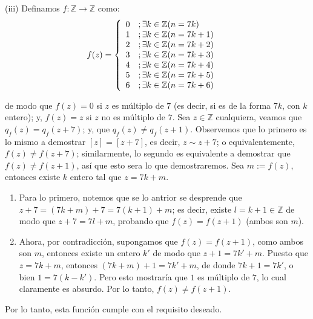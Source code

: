 \documentclass[letterpaper,DIV=14,headsepline,12pt]{scrartcl}
\makeatletter
\newenvironment{solucion}[1][]{%
        \par\pushQED{\hfill \lozenge}%
        \normalfont\topsep6pt \partopsep0pt %
        \trivlist
        \item[\hskip\labelsep
                \textbf{\textit{Solución.}}%
        ]#1
        }{%
        \popQED\endtrivlist\@endpefalse
    }
\makeatother
\begin{document}
\begin{solucion}
        (iii) Definamos $f:\mathbb{Z} \to \mathbb{Z}$ como:
        \begin{align*}
            f(z) &= \left\lbrace \begin{array}{l l}
            0 & ; \exists k \in \mathbb{Z} (n = 7k) \\
            1 & ; \exists k \in \mathbb{Z} (n = 7k+1) \\
            2 & ; \exists k \in \mathbb{Z} (n = 7k+2) \\
            3 & ; \exists k \in \mathbb{Z} (n = 7k+3) \\
            4 & ; \exists k \in \mathbb{Z} (n = 7k+4) \\
            5 & ; \exists k \in \mathbb{Z} (n = 7k+5) \\
            6 & ; \exists k \in \mathbb{Z} (n = 7k+6)
        \end{array} \right.
        \end{align*}
        
        de modo que $f(z)=0$ si $z$ es múltiplo de $7$ (es decir, si es de la forma $7k$, con $k$ entero); y, $f(z)=z$ si $z$ no es múltiplo de $7$. Sea $z \in \mathbb{Z}$ cualquiera, veamos que $q_f(z)=q_f(z+7)$; y, que $q_f(z)\neq q_f(z+1)$. Observemos que lo primero es lo mismo a demostrar $[z]=[z+7]$, es decir, $z \sim z+7$; o equivalentemente, $f(z) \neq f(z+7)$; similarmente, lo segundo es equivalente a demostrar que $f(z) \neq f(z+1)$, así que esto sera lo que demostraremos. Sea $m:=f(z)$, entonces existe $k$ entero tal que $z=7k+m$.
        \begin{enumerate}
            \item Para lo primero, notemos que se lo antrior se desprende que $z+7=(7k+m)+7=7(k+1)+m$; es decir, existe $l=k+1 \in \mathbb{Z}$ de modo que $z+7=7l+m$, probando que $f(z)=f(z+1)$ (ambos son $m$).
            
            \item Ahora, por contradicción, supongamos que $f(z)=f(z+1)$, como ambos son $m$, entonces existe un entero $k'$ de modo que $z+1=7k'+m$. Puesto que $z=7k+m$, entonces $(7k+m)+1=7k'+m$, de donde $7k+1=7k'$, o bien $1=7(k-k')$. Pero esto mostraría que $1$ es múltiplo de $7$, lo cual claramente es absurdo. Por lo tanto, $f(z) \neq f(z+1)$.
        \end{enumerate}

        Por lo tanto, esta función cumple con el requisito deseado.
    \end{solucion}
\end{document}

